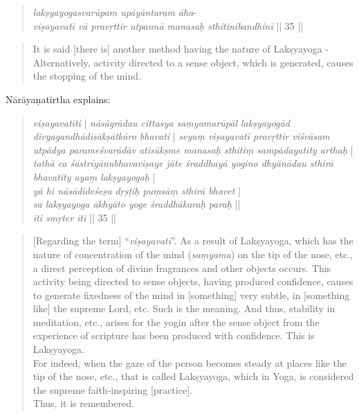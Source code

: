 \begin{quote}
  \textit{lakṣyayogasvarūpam upāyāntaram āha}-\\
  \textit{viṣayavatī vā pravṛttir utpannā manasaḥ sthitinibandhinī} || 35 ||
\end{quote}
\begin{quote}
It is said [there is] another method having the nature of Lakṣyayoga - \\
Alternatively, activity directed to a sense object, which is generated, causes the stopping of the mind.  
\end{quote}

Nārāyaṇatīrtha explains:

\begin{quote}
  \textit{viṣayavatīti} | \textit{nāsāgrādau cittasya saṃyamarūpāl lakṣyayogād divyagandhādisākṣātkāro bhavati} | \textit{seyaṃ viṣayavatī pravṛttir viśvāsam utpādya parameśvarādāv atisūkṣme manasaḥ sthitiṃ sampādayatīty arthaḥ} | \textit{tathā ca śāstrīyānubhavaviṣaye jāte śraddhayā yogino dhyānādau sthirā bhavatīty ayaṃ lakṣyayogaḥ} |\\

  \textit{yā hi nāsādideśeṣu dṛṣṭiḥ puṃsāṃ sthirā bhavet} |\\
  \textit{sa lakṣyayoga ākhyāto yoge śraddhākaraḥ paraḥ} ||\\
  
\textit{iti smṛter iti} || 35 ||
\end{quote}
\begin{quote}
  [Regarding the term] ``\textit{viṣayavatī}''. As a result of Lakṣyayoga, which has the nature of concentration of the mind (\textit{saṃyama}) on the tip of the nose, etc., a direct perception of divine fragrances and other objects occurs. This activity being directed to sense objects, having produced confidence, causes to generate fixedness of the mind in [something] very subtle, in [something like] the supreme Lord, etc. Such is the meaning. 
  And thus, stability in meditation, etc., arises for the yogin after the sense object from the experience of scripture has been produced with confidence. This is Lakṣyayoga.\\
  
  For indeed, when the gaze of the person becomes steady at places like the tip of the nose, etc., that is called Lakṣyayoga, which in Yoga, is considered the supreme faith-inspiring [practice].\\

  Thus, it is remembered.
  \end{quote}

